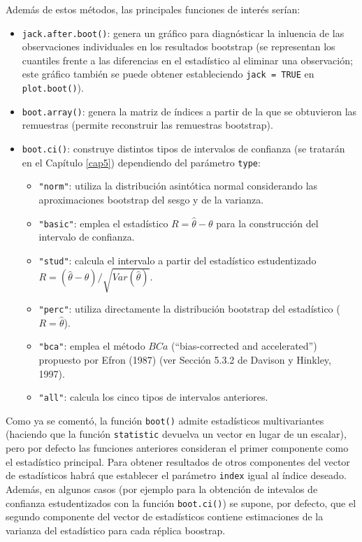\documentclass[
]{book}
\theoremstyle{definition}
\theoremstyle{definition}
\theoremstyle{definition}
\theoremstyle{remark}
\begin{document}
Además de estos métodos, las principales funciones de interés serían:

\begin{itemize}
\item
  \texttt{jack.after.boot()}: genera un gráfico para diagnósticar la inluencia
  de las observaciones individuales en los resultados bootstrap
  (se representan los cuantiles frente a las diferencias en el estadístico
  al eliminar una observación; este gráfico también se puede obtener estableciendo
  \texttt{jack\ =\ TRUE} en \texttt{plot.boot()}).
\item
  \texttt{boot.array()}: genera la matriz de índices a partir de la que se obtuvieron las
  remuestras (permite reconstruir las remuestras bootstrap).
\item
  \texttt{boot.ci()}: construye distintos tipos de intervalos de confianza
  (se tratarán en el Capítulo \ref{cap5}) dependiendo del parámetro \texttt{type}:

  \begin{itemize}
  \item
    \texttt{"norm"}: utiliza la distribución asintótica normal considerando las
    aproximaciones bootstrap del sesgo y de la varianza.
  \item
    \texttt{"basic"}: emplea el estadístico \(R = \hat \theta - \theta\) para la
    construcción del intervalo de confianza.
  \item
    \texttt{"stud"}: calcula el intervalo a partir del estadístico estudentizado
    \(R = \left( \hat \theta - \theta \right) / \sqrt{Var(\hat \theta)}\).
  \item
    \texttt{"perc"}: utiliza directamente la distribución bootstrap del estadístico
    (\(R = \hat \theta\)).
  \item
    \texttt{"bca"}: emplea el método \(BCa\) (``bias-corrected and accelerated'')
    propuesto por Efron (1987) (ver Sección 5.3.2 de Davison y Hinkley, 1997).
  \item
    \texttt{"all"}: calcula los cinco tipos de intervalos anteriores.
  \end{itemize}
\end{itemize}

Como ya se comentó, la función \texttt{boot()} admite estadísticos multivariantes
(haciendo que la función \texttt{statistic} devuelva un vector en lugar de un escalar),
pero por defecto las funciones anteriores consideran el primer componente
como el estadístico principal.
Para obtener resultados de otros componentes del vector de estadísticos
habrá que establecer el parámetro \texttt{index} igual al índice deseado.
Además, en algunos casos (por ejemplo para la obtención de intevalos de confianza
estudentizados con la función \texttt{boot.ci()}) se supone, por defecto, que el segundo
componente del vector de estadísticos contiene estimaciones de la varianza del
estadístico para cada réplica boostrap.
\end{document}
